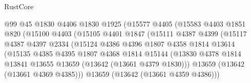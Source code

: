 \begin{lexlean}{RustCore}
\begin{coremodule}
                                    @99
                                    @45
                                    @1830
                                    @4406
                                    @1830
                                    @1925
                                    (@15577
                                      @4405
                                      (@15583
                                        @4403
                                        @1851
                                        @820
                                        (@15100
                                          @4403
                                          (@15105
                                            @4401
                                            @1847
                                            (@15111
                                              @4387
                                              @4399
                                              (@15117
                                                @4387
                                                @4397
                                                @2334
                                                (@15124
                                                  @4386
                                                  @4396
                                                  @1807
                                                  @4358
                                                  @1814
                                                  @13614
                                                  (@15135
                                                    @4385
                                                    @4395
                                                    @1807
                                                    @4368
                                                    @1814
                                                    @15144
                                                    (@13830
                                                      @4378
                                                      @1814
                                                      @13841
                                                      @13655
                                                      @13659
                                                      (@13642 (@13661 @4379 @1830)))
                                                    @13659
                                                    (@13642 (@13661 @4369 @4385)))
                                                  @13659
                                                  (@13642 (@13661 @4359 @4386)))

\end{coremodule}
\end{lexlean}
